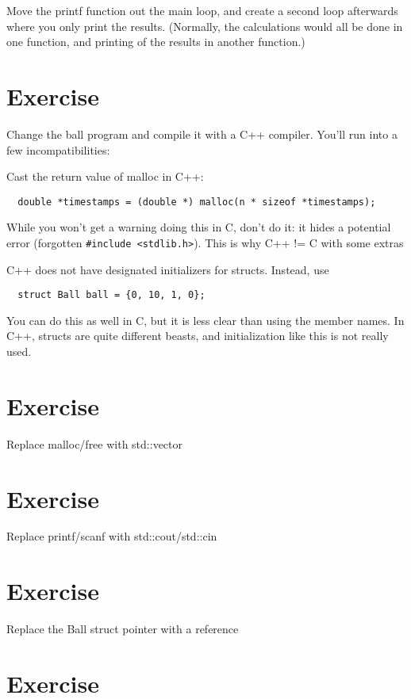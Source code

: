 \documentclass[a4paper]{article}
\begin{document}
Move the printf function out the main loop, and create a second loop afterwards where you only print the results.
(Normally, the calculations would all be done in one function, and printing of the results in another function.)

\clearpage

\section{Exercise}

Change the ball program and compile it with a C++ compiler. You’ll run into a few incompatibilities:

Cast the return value of malloc in C++:
\begin{lstlisting}
  double *timestamps = (double *) malloc(n * sizeof *timestamps); 
\end{lstlisting}

While you won’t get a warning doing this in C, don’t do it: it hides a potential error (forgotten \lstinline|#include <stdlib.h>|).
This is why C++ != C with some extras

C++ does not have designated initializers for structs. Instead, use
\begin{lstlisting}
  struct Ball ball = {0, 10, 1, 0};
\end{lstlisting}
You can do this as well in C, but it is less clear than using the member names.
In C++, structs are quite different beasts, and initialization like this is not really used.

\section{Exercise}

Replace malloc/free with std::vector

\section{Exercise}

Replace printf/scanf with std::cout/std::cin

\section{Exercise}

Replace the Ball struct pointer with a reference

\section{Exercise}
\end{document}
